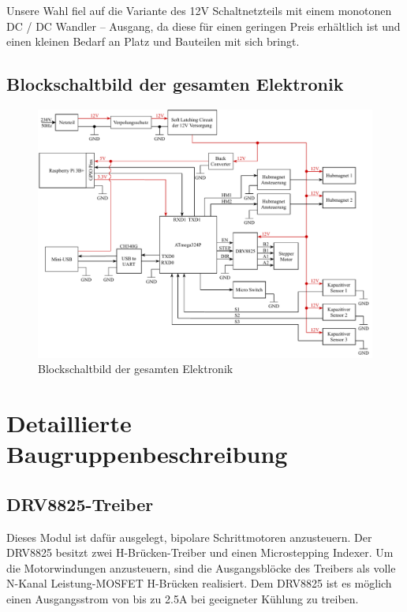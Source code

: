Unsere Wahl fiel auf die Variante des 12V Schaltnetzteils mit einem monotonen DC / DC Wandler – Ausgang, da diese für einen geringen Preis erhältlich ist und einen kleinen Bedarf an Platz und Bauteilen mit sich bringt.
\newpage

\subsection{Blockschaltbild der gesamten Elektronik}

\begin{figure}[hb]
    \centering
    \includegraphics[scale=0.8,page=1]{fig/elektro/ElectroBlockDiagram.pdf}
    \caption{Blockschaltbild der gesamten Elektronik}
\end{figure}

\newpage
\section{Detaillierte Baugruppenbeschreibung}

\subsection{DRV8825-Treiber}
Dieses Modul ist dafür ausgelegt, bipolare Schrittmotoren anzusteuern. Der DRV8825 besitzt zwei H-Brücken-Treiber und einen Microstepping Indexer.
Um die Motorwindungen anzusteuern, sind die Ausgangsblöcke des Treibers als volle N-Kanal Leistung-MOSFET H-Brücken realisiert.
Dem DRV8825 ist es möglich einen Ausgangsstrom von bis zu 2.5A bei geeigneter Kühlung zu treiben.

